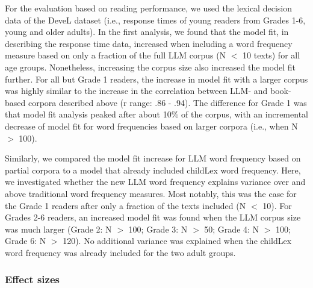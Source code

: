 \documentclass[doc, a4paper]{apa7}
\begin{document}
For the evaluation based on reading performance, we used the lexical decision data of the DeveL dataset (i.e., response times of young readers from Grades 1-6, young and older adults). In the first analysis, we found that the model fit, in describing the response time data, increased when including a word frequency measure based on only a fraction of the full LLM corpus (N $<$ 10 texts) for all age groups. Nonetheless, increasing the corpus size also increased the model fit further. For all but Grade 1 readers, the increase in model fit with a larger corpus was highly similar to the increase in the correlation between LLM- and book-based corpora described above (r range: .86 - .94). The difference for Grade 1 was that model fit analysis peaked after about 10\% of the corpus, with an incremental decrease of model fit for word frequencies based on larger corpora (i.e., when N $>$ 100). 

Similarly, we compared the model fit increase for LLM word frequency based on partial corpora to a model that already included childLex word frequency. Here, we investigated whether the new LLM word frequency explains variance over and above traditional word frequency measures. Most notably, this was the case for the Grade 1 readers after only a fraction of the texts included (N $<$ 10). For Grades 2-6 readers, an increased model fit was found when the LLM corpus size was much larger (Grade 2: N $>$ 100; Grade 3: N $>$ 50; Grade 4: N $>$ 100; Grade 6: N $>$ 120). No additional variance was explained when the childLex word frequency was already included for the two adult groups. 
\clearpage


\subsubsection{Effect sizes}
\end{document}
